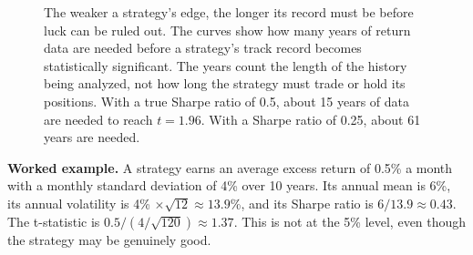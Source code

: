 \begin{figure}[!htbp]
  \centering
  \caption{The weaker a strategy's edge, the longer its record must be before luck can be ruled out. The curves show how many years of return data are needed before a strategy's track record becomes statistically significant. The years count the length of the history being analyzed, not how long the strategy must trade or hold its positions. With a true Sharpe ratio of 0.5, about 15 years of data are needed to reach $t = 1.96$. With a Sharpe ratio of 0.25, about 61 years are needed.}
  \label{fig:01-years}
\end{figure}



\textbf{Worked example.} A strategy earns an average excess return of 0.5\% a month with a monthly standard deviation of 4\% over 10 years. Its annual mean is 6\%, its annual volatility is 4\% $\times \sqrt{12} \approx 13.9$\%, and its Sharpe ratio is $6/13.9 \approx 0.43$. The t-statistic is $0.5 / (4/\sqrt{120}) \approx 1.37$. This is not  at the 5\% level, even though the strategy may be genuinely good.



